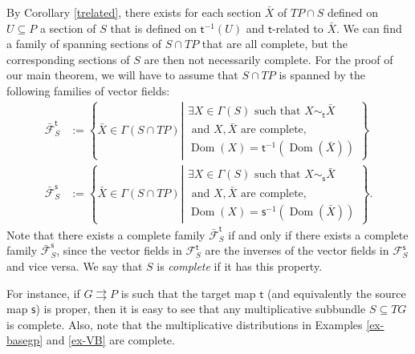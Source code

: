 \documentclass{amsart}
\theoremstyle{definition}
\begin{document}
By Corollary \ref{trelated}, there exists for each section $\bar X$
of $TP\cap S$ defined on $U\subseteq P$ a section 
of $S$ that is defined on ${{\mathsf{t}}}{^{-1}}(U)$ and ${{\mathsf{t}}}$-related to $\bar X$. We can find a family of spanning
sections of $S\cap TP$ that are all complete, but the 
corresponding sections of $S$ are then not necessarily complete.
For the proof of our main theorem,
 we will have to assume that $S\cap TP$ is spanned by the following families
of vector fields:
\begin{align}
\bar{\mathcal F}^{{\mathsf{t}}}_S&:=\left\{\bar X\in\Gamma(S\cap TP)
\left|\begin{array}{c}
 \exists X\in\Gamma(S) \text{ such that } 
X\sim_{{\mathsf{t}}} \bar X\\
\text{ and } X, \bar X \text{ are complete},\\
 \operatorname{Dom}(X)={{\mathsf{t}}}{^{-1}}(\operatorname{Dom}(\bar X))
\end{array}\right.
\right\}\label{complete_STP_tg}\\
\bar{\mathcal F}^{{\mathsf{s}}}_S&:=\left\{\bar X\in\Gamma(S\cap TP)
\left|\begin{array}{c}
 \exists X\in\Gamma(S) \text{ such that } 
X\sim_{{\mathsf{s}}} \bar X\\
\text{ and } X, \bar X \text{ are complete},\\
 \operatorname{Dom}(X)={{\mathsf{s}}}{^{-1}}(\operatorname{Dom}(\bar X))
\end{array}\right.
\right\}.\label{complete_STP_s}
\end{align}
Note that there exists a complete family $\bar{\mathcal F}^{{\mathsf{t}}}_S$ if and only if there exists 
a complete family $\bar{\mathcal F}^{{\mathsf{s}}}_S$, since the vector fields 
in $\mathcal F^{{\mathsf{t}}}_S$ are the inverses of the vector fields in 
$\mathcal F^{{\mathsf{s}}}_S$ and vice versa. 
We say that $S$ is \emph{complete} if it has this property.

For instance, if $G{{\rightrightarrows}} P$ is such that the target map ${{\mathsf{t}}}$ (and equivalently the source map ${{\mathsf{s}}}$)
 is proper, then it is easy to see that any multiplicative subbundle $S\subseteq TG$
is complete.
Also, note that the multiplicative distributions in Examples \ref{ex-basegp} and \ref{ex-VB}
are complete.

\bigskip
\end{document}
